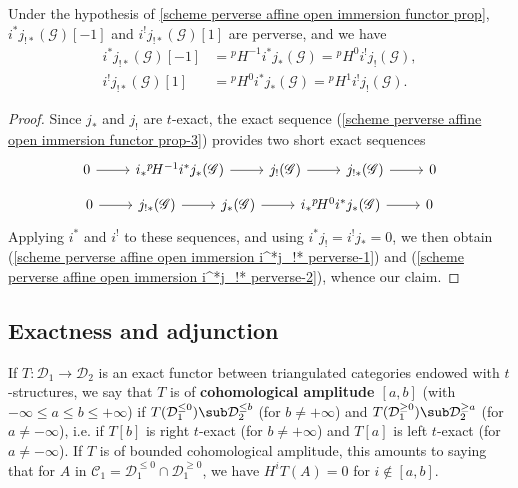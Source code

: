 \begin{corollary}\label{scheme perverse affine open immersion i^*j_!* perverse}
Under the hypothesis of \cref{scheme perverse affine open immersion functor prop}, $i^*j_{!*}(\mathscr{G})[-1]$ and $i^!j_{!*}(\mathscr{G})[1]$ are perverse, and we have
\begin{align}
i^*j_{!*}(\mathscr{G})[-1]&={^p\!H^{-1}}i^*j_*(\mathscr{G})={^p\!H^0}i^!j_!(\mathscr{G}),\label{scheme perverse affine open immersion i^*j_!* perverse-1}\\
i^!j_{!*}(\mathscr{G})[1]&={^p\!H^0}i^*j_*(\mathscr{G})={^p\!H^1}i^!j_!(\mathscr{G}).\label{scheme perverse affine open immersion i^*j_!* perverse-2}
\end{align}
\end{corollary}
\begin{proof}
Since $j_*$ and $j_!$ are $t$-exact, the exact sequence (\ref{scheme perverse affine open immersion functor prop-3}) provides two short exact sequences
\begin{equation}\label{scheme perverse affine open immersion i^*j_!* perverse-3}
\begin{tikzcd}
0\ar[r]&i_*{^p\!H^{-1}}i^*j_*(\mathscr{G})\ar[r]&j_!(\mathscr{G})\ar[r]&j_{!*}(\mathscr{G})\ar[r]&0
\end{tikzcd}
\end{equation}
\vspace*{-4mm}
\begin{equation}\label{scheme perverse affine open immersion i^*j_!* perverse-4}
\begin{tikzcd}
0\ar[r]&j_{!*}(\mathscr{G})\ar[r]&j_*(\mathscr{G})\ar[r]&i_*{^p\!H^{0}}i^*j_*(\mathscr{G})\ar[r]&0
\end{tikzcd}
\end{equation}
Applying $i^*$ and $i^!$ to these sequences, and using $i^*j_!=i^!j_*=0$, we then obtain (\ref{scheme perverse affine open immersion i^*j_!* perverse-1}) and (\ref{scheme perverse affine open immersion i^*j_!* perverse-2}), whence our claim.
\end{proof}

\subsection{Exactness and adjunction}
If $T:\mathcal{D}_1\to\mathcal{D}_2$ is an exact functor between triangulated categories endowed with $t$-structures, we say that $T$ is of \textbf{cohomological amplitude $[a,b]$} (with $-\infty\leq a\leq b\leq+\infty$) if $T(\mathcal{D}_1^{\leq 0})\sub\mathcal{D}_2^{\leq b}$ (for $b\neq+\infty$) and $T(\mathcal{D}_1^{\geq 0})\sub\mathcal{D}_2^{\geq a}$ (for $a\neq-\infty$), i.e. if $T[b]$ is right $t$-exact (for $b\neq+\infty$) and $T[a]$ is left $t$-exact (for $a\neq-\infty$). If $T$ is of bounded cohomological amplitude, this amounts to saying that for $A$ in $\mathcal{C}_1=\mathcal{D}_1^{\leq 0}\cap\mathcal{D}_1^{\geq 0}$, we have $H^iT(A)=0$ for $i\notin[a,b]$.\par

